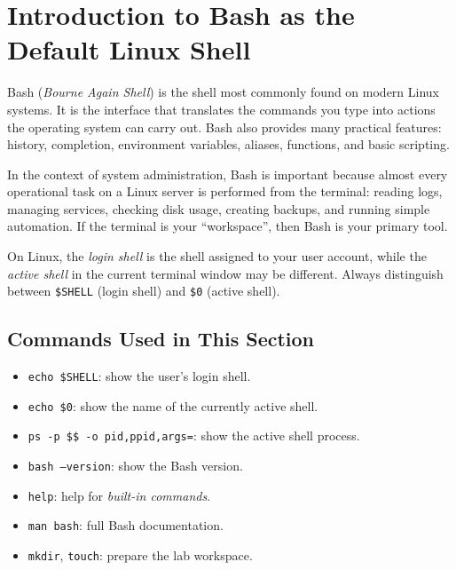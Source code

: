\section{Introduction to Bash as the Default Linux Shell}
\label{sec:bash-introduction}

Bash (\textit{Bourne Again Shell}) is the shell most commonly found on modern
Linux systems. It is the interface that translates the commands you type into
actions the operating system can carry out. Bash also provides many practical
features: history, completion, environment variables, aliases, functions, and
basic scripting.

In the context of system administration, Bash is important because almost
every operational task on a Linux server is performed from the terminal:
reading logs, managing services, checking disk usage, creating backups, and
running simple automation. If the terminal is your ``workspace'', then Bash
is your primary tool.

\begin{tipbox}
On Linux, the \textit{login shell} is the shell assigned to your user account,
while the \textit{active shell} in the current terminal window may be
different. Always distinguish between \texttt{\$SHELL} (login shell) and
\texttt{\$0} (active shell).
\end{tipbox}

\subsection*{Commands Used in This Section}

\begin{itemize}
  \item \texttt{echo \$SHELL}: show the user's login shell.
  \item \texttt{echo \$0}: show the name of the currently active shell.
  \item \texttt{ps -p \$\$ -o pid,ppid,args=}: show the active shell process.
  \item \texttt{bash --version}: show the Bash version.
  \item \texttt{help}: help for \textit{built-in commands}.
  \item \texttt{man bash}: full Bash documentation.
  \item \texttt{mkdir}, \texttt{touch}: prepare the lab workspace.
\end{itemize}

